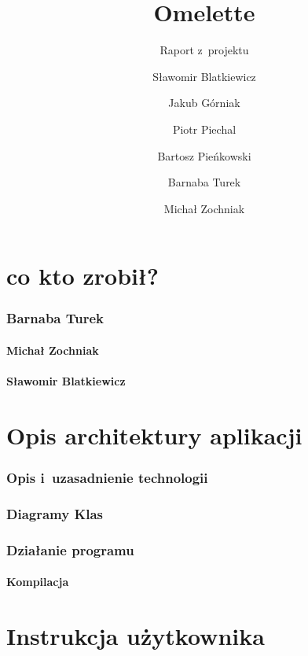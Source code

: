 \documentclass[a4paper]{scrartcl}
\begin{document}
\sloppy

\title{Omelette}
\subtitle{Raport z~projektu}
\author{
  Sławomir Blatkiewicz\and
  Jakub Górniak       \and
  Piotr Piechal       \and
  Bartosz Pieńkowski  \and
  Barnaba Turek       \and
  Michał Zochniak
}
\maketitle

\part{co kto zrobił?}
\section{Barnaba Turek}

\subsection{Michał Zochniak}

\subsection{Sławomir Blatkiewicz}


\part{Opis architektury aplikacji}
  \section{Opis i~uzasadnienie technologii}
    
  \section{Diagramy Klas}
    
  \section{Działanie programu}
    \subsection{Kompilacja}
      
\part{Instrukcja użytkownika}
	
	
\end{document}

